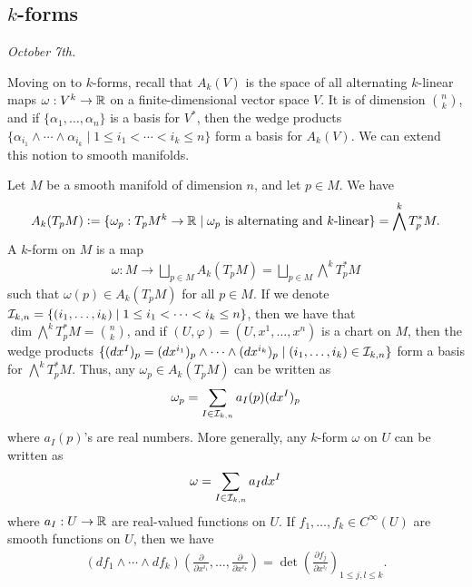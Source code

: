 \subsection{$k$-forms}
\noindent \textit{October 7th.}

Moving on to $k$-forms, recall that $A_{k}(V)$ is the space of all alternating $k$-linear maps $\omega:V^{k} \to \mathbb{R}$ on a finite-dimensional vector space $V$. It is of dimension $\binom{n}{k}$, and if $\{\alpha_{1},\ldots,\alpha_{n}\}$ is a basis for $V^{\ast}$, then the wedge products $\{\alpha_{i_{1}} \wedge \cdots \wedge \alpha_{i_{k}} \mid 1 \leq i_{1} < \cdots < i_{k} \leq n\}$ form a basis for $A_{k}(V)$. We can extend this notion to smooth manifolds.

Let $M$ be a smooth manifold of dimension $n$, and let $p \in M$. We have
\begin{align}
    A_{k}(T_{p}M) \vcentcolon= \{\omega_{p}:T_{p}M^{k} \to \mathbb{R} \mid \omega_{p} \text{ is alternating and $k$-linear}\} = \bigwedge^{k}T_{p}^{\ast}M.
\end{align}
A $k$-form on $M$ is a map
\begin{align}
    \omega:M \to \bigsqcup_{p \in M} A_{k}(T_{p}M) = \bigsqcup_{p \in M} \bigwedge^{k}T_{p}^{\ast}M
\end{align}
such that $\omega(p) \in A_{k}(T_{p}M)$ for all $p \in M$. If we denote $\mathcal{I}_{k,n} = \{(i_{1},\ldots,i_{k}) \mid 1 \leq i_{1} < \cdots < i_{k} \leq n\}$, then we have that $\dim \bigwedge^{k} T_{p}^{\ast}M = \binom{n}{k}$, and if $(U,\varphi) = (U,x^{1},\ldots,x^{n})$ is a chart on $M$, then the wedge products $\{(dx^{I})_{p} = (dx^{i_{1}})_{p} \wedge \cdots \wedge (dx^{i_{k}})_{p} \mid (i_{1},\ldots,i_{k}) \in \mathcal{I}_{k,n}\}$ form a basis for $\bigwedge^{k}T_{p}^{\ast}M$. Thus, any $\omega_{p} \in A_{k}(T_{p}M)$ can be written as
\begin{align}
    \omega_{p} = \sum_{I \in \mathcal{I}_{k,n}} a_{I}(p)(dx^{I})_{p}
\end{align}
where $a_{I}(p)$'s are real numbers. More generally, any $k$-form $\omega$ on $U$ can be written as
\begin{align}
    \omega = \sum_{I \in \mathcal{I}_{k,n}} a_{I} dx^{I}
\end{align}
where $a_{I}:U \to \mathbb{R}$ are real-valued functions on $U$. If $f_{1},\ldots,f_{k} \in C^{\infty}(U)$ are smooth functions on $U$, then we have
\begin{align}
    (df_{1} \wedge \cdots \wedge df_{k})\left( \frac{\partial}{\partial x^{i_{1}}}, \ldots, \frac{\partial}{\partial x^{i_{k}}} \right) = \det\left( \frac{\partial f_{j}}{\partial x^{i_{l}}} \right)_{1 \leq j,l \leq k}.
\end{align}
